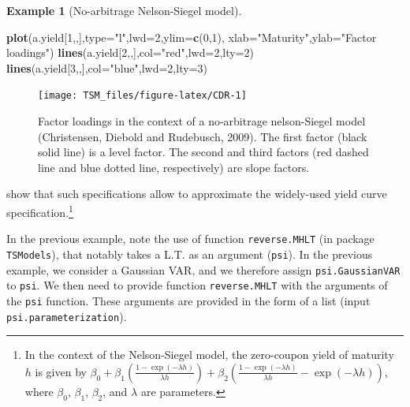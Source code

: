 \documentclass[
  12pt,
]{book}
\newenvironment{Shaded}{\begin{snugshade}}{\end{snugshade}}
\newcommand{\AttributeTok}[1]{\textcolor[rgb]{0.13,0.29,0.53}{#1}}
\newcommand{\DecValTok}[1]{\textcolor[rgb]{0.00,0.00,0.81}{#1}}
\newcommand{\FunctionTok}[1]{\textcolor[rgb]{0.13,0.29,0.53}{\textbf{#1}}}
\newcommand{\NormalTok}[1]{#1}
\newcommand{\StringTok}[1]{\textcolor[rgb]{0.31,0.60,0.02}{#1}}
\theoremstyle{definition}
\theoremstyle{definition}
\newtheorem{example}{Example}[chapter]
\theoremstyle{definition}
\theoremstyle{definition}
\theoremstyle{remark}
\begin{document}
\begin{example}[No-arbitrage Nelson-Siegel model]
\begin{Shaded}
\begin{Highlighting}[]
\FunctionTok{plot}\NormalTok{(a.yield[}\DecValTok{1}\NormalTok{,,],}\AttributeTok{type=}\StringTok{"l"}\NormalTok{,}\AttributeTok{lwd=}\DecValTok{2}\NormalTok{,}\AttributeTok{ylim=}\FunctionTok{c}\NormalTok{(}\DecValTok{0}\NormalTok{,}\DecValTok{1}\NormalTok{),}
     \AttributeTok{xlab=}\StringTok{"Maturity"}\NormalTok{,}\AttributeTok{ylab=}\StringTok{"Factor loadings"}\NormalTok{)}
\FunctionTok{lines}\NormalTok{(a.yield[}\DecValTok{2}\NormalTok{,,],}\AttributeTok{col=}\StringTok{"red"}\NormalTok{,}\AttributeTok{lwd=}\DecValTok{2}\NormalTok{,}\AttributeTok{lty=}\DecValTok{2}\NormalTok{)}
\FunctionTok{lines}\NormalTok{(a.yield[}\DecValTok{3}\NormalTok{,,],}\AttributeTok{col=}\StringTok{"blue"}\NormalTok{,}\AttributeTok{lwd=}\DecValTok{2}\NormalTok{,}\AttributeTok{lty=}\DecValTok{3}\NormalTok{)}
\end{Highlighting}
\end{Shaded}

\begin{figure}
\texttt{[image: TSM\_files/figure-latex/CDR-1]} \caption{Factor loadings in the context of a no-arbitrage nelson-Siegel model (Christensen, Diebold and Rudebusch, 2009). The first factor (black solid line) is a level factor. The second and third factors (red dashed line and blue dotted line, respectively) are slope factors.}\label{fig:CDR}
\end{figure}

\citet{Christensen_Diebold_Rudebusch_2009} show that such specifications allow to approximate the widely-used \citet{Nelson_Siegel_1987} yield curve specification.\footnote{In the context of the Nelson-Siegel model, the zero-coupon yield of maturity \(h\) is given by \(\beta_0 + \beta_1\left(\frac{1 - \exp(-\lambda h)}{\lambda h}\right)+\beta_2\left(\frac{1 - \exp(-\lambda h)}{\lambda h}-\exp(-\lambda h)\right)\), where \(\beta_0\), \(\beta_1\), \(\beta_2\), and \(\lambda\) are parameters.}
\end{example}

In the previous example, note the use of function \texttt{reverse.MHLT} (in package \texttt{TSModels}), that notably takes a L.T. as an argument (\texttt{psi}). In the previous example, we consider a Gaussian VAR, and we therefore assign \texttt{psi.GaussianVAR} to \texttt{psi}. We then need to provide function \texttt{reverse.MHLT} with the arguments of the \texttt{psi} function. These arguments are provided in the form of a list (input \texttt{psi.parameterization}).
\end{document}
